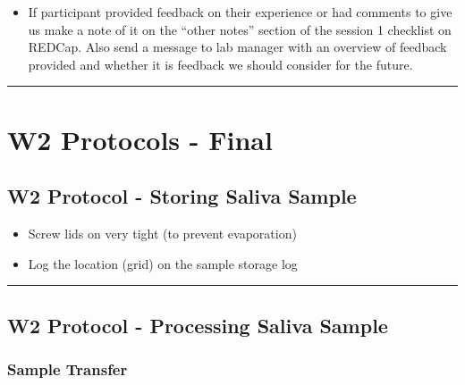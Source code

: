 \documentclass[]{book}
\providecommand{\tightlist}{%
  \setlength{\itemsep}{0pt}\setlength{\parskip}{0pt}}
\begin{document}
\begin{itemize}
\tightlist
\item
  If participant provided feedback on their experience or had comments to give us make a note of it on the ``other notes'' section of the session 1 checklist on REDCap. Also send a message to lab manager with an overview of feedback provided and whether it is feedback we should consider for the future.
\end{itemize}

\begin{center}\rule{0.5\linewidth}{0.5pt}\end{center}

\hypertarget{w2-protocols---final}{%
\section{W2 Protocols - Final}\label{w2-protocols---final}}

\hypertarget{w2-protocol---storing-saliva-sample}{%
\subsection{W2 Protocol - Storing Saliva Sample}\label{w2-protocol---storing-saliva-sample}}

\begin{itemize}
\tightlist
\item
  Screw lids on very tight (to prevent evaporation)
\item
  Log the location (grid) on the sample storage log
\end{itemize}

\begin{center}\rule{0.5\linewidth}{0.5pt}\end{center}

\hypertarget{w2-protocol---processing-saliva-sample}{%
\subsection{W2 Protocol - Processing Saliva Sample}\label{w2-protocol---processing-saliva-sample}}

\hypertarget{sample-transfer-2}{%
\subsubsection{Sample Transfer}\label{sample-transfer-2}}
\end{document}
